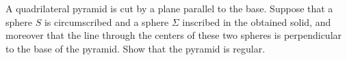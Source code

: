 A quadrilateral pyramid is cut by a plane parallel to the base. Suppose that a sphere $S$ is circumscribed and a sphere $\Sigma$ inscribed in the obtained solid, and moreover that the line through the centers of these two spheres is perpendicular to the base of the pyramid. Show that the pyramid is regular.